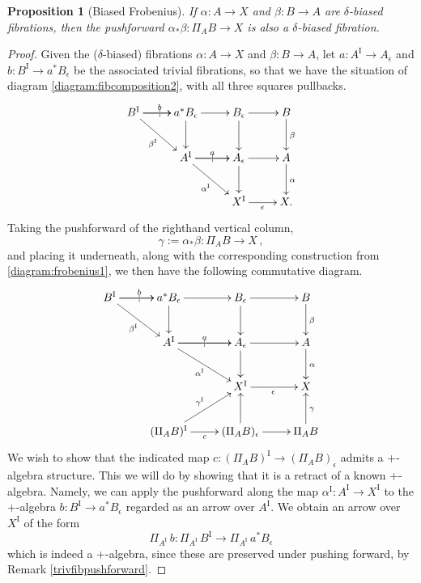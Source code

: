 \documentclass[12pt]{article}
\newcommand{\ra}{\ensuremath{\rightarrow}}
\renewcommand{\to}{\ensuremath{\rightarrow}}
\newcommand{\too}{\ensuremath{\longrightarrow}}
\newcommand{\I}{\ensuremath{\mathrm{I}}}
\newtheorem{proposition}[theorem]{Proposition}
\newtheorem{lemma}[theorem]{Lemma}
\theoremstyle{remark}
\theoremstyle{definition}
\begin{document}

\begin{proposition}[Biased Frobenius]\label{prop:Frobenius}
If $\alpha : A \ra X$ and $\beta: B\ra A$  are $\delta$-biased fibrations, then the pushforward $\alpha_*\beta : \Pi_AB \ra X$ is also a $\delta$-biased fibration.
\end{proposition}

\begin{proof}
Given the ($\delta$-biased) fibrations $\alpha : A \ra X$ and $\beta: B\ra A$, let $a : A^\I \ra A_\epsilon$ and $b : B^\I \ra a^*B_\epsilon$ be the associated trivial fibrations, so that we have the situation of diagram \eqref{diagram:fibcomposition2}, with all three squares pullbacks.
\begin{equation}\label{diagram:frobenius1.5}
\xymatrix{
B^\I \ar[r]|| \ar[r]^{b} \ar[rd]_{\beta^\I}  & a^*B_\epsilon \ar[r]  \ar[d]  & B_{\epsilon}  \ar[d]   \ar[r] & B \ar[d]^\beta \\
&A^\I \ar[r]|| \ar[r]^{a} \ar[rd]_{\alpha^\I}  & A_{\epsilon} \ar[d]   \ar[r] & A \ar[d]^\alpha \\
&& X^\I \ar[r]_{\epsilon} &  X.
}
\end{equation}
Taking the pushforward of the righthand vertical column, 
\[
\gamma:= \alpha_*\beta : \Pi_A{B} \to X\,,
\]
and placing it underneath, along with the corresponding construction from \eqref{diagram:frobenius1}, we then have the following commutative diagram.
 \begin{equation}\label{diagram:frobenius2}
\xymatrix{
B^\I \ar[r]|| \ar[r]^{b} \ar[rd]_{\beta^\I}  & a^*B_\epsilon \ar[r]  \ar[d]  & B_{\epsilon}  \ar[d]   \ar[r] & B \ar[d]^\beta \\
& A^\I \ar[r]|| \ar[r]^{a} \ar[rd]_{\alpha^\I}  & A_{\epsilon} \ar[d]   \ar[r] & A \ar[d]^\alpha \\
&& X^\I \ar[r]_{\epsilon} &  X \\
& (\Pi_AB)^\I  \ar[r]_c  \ar[ru]^{\gamma^\I} & (\Pi_AB)_\epsilon  \ar[u] \ar[r] & \Pi_AB \ar[u]_\gamma 
}
\end{equation}
We wish to show that the indicated  map $c : (\Pi_AB)^\I \ra (\Pi_AB)_\epsilon$
admits a +-algebra structure. This we will do by showing that it is a retract of a known +-algebra.
Namely, we can apply the pushforward along the map $\alpha^\I:A^\I \ra X^\I$ to the +-algebra $b : B^\I \ra a^*B_\epsilon$ regarded as an arrow over $A^\I$.  We obtain an arrow over $X^\I$ of the form
\begin{equation}\label{plusalgretract}
\Pi_{A^\I}\,b :  \Pi_{A^\I}\,B^\I \too \Pi_{A^\I}\,a^*B_\epsilon 
\end{equation}
which is indeed a +-algebra, since these are preserved under pushing forward, by Remark \ref{trivfibpushforward}.


\end{proof}
\end{document}
